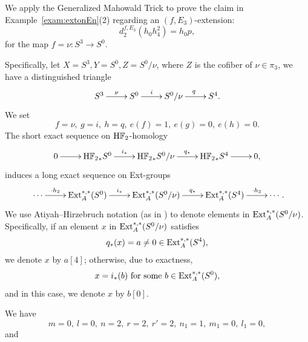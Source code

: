 \documentclass{amsart}
\numberwithin{equation}{section}
\newcommand{\HF}{\mathrm{H}\bF_2}
\begin{document}
\begin{example} \label{exam:Mahowald}
    We apply the Generalized Mahowald Trick to prove the claim in Example~\ref{exam:extonEn}(2) regarding an $(f, E_3)$-extension:
        $$d_2^{f, E_3} (h_0h_4^2) = h_0 p,$$
        for the map $f=\nu:S^3 \rightarrow S^0$.

        Specifically, let $X = S^3, Y = S^0, Z = S^0/\nu$, where $Z$ is the cofiber of $\nu \in \pi_3$, we have a distinguished triangle
        $$\xymatrix{S^3 \ar[r]^{\nu} & S^0 \ar[r]^-{i} & S^0/\nu \ar[r]^{q} & S^4.}$$
We set
$$f=\nu, \ g=i, \ h=q, \ e(f)=1, \ e(g)=0, \ e(h)=0.$$
The short exact sequence on $\HF$-homology
$$\xymatrix{0 \ar[r] & {\HF}_*S^0 \ar[r]^-{i_*} & {\HF}_*S^0/\nu \ar[r]^-{q_*} & {\HF}_*S^4 \ar[r] & 0,}$$
induces a long exact sequence on Ext-groups
$$\xymatrix{\cdots \ar[r]^-{\cdot h_2} & {\Ext}_A^{*,*}(S^0) \ar[r]^-{i_*} & {\Ext}_A^{*,*}(S^0/\nu) \ar[r]^-{q_*} & {\Ext}_A^{*,*}(S^4) \ar[r]^-{\cdot h_2} & \cdots}.$$
We use Atiyah--Hirzebruch notation (as in \cite[Notation 3.3]{WX61, WangXu51ext}) to denote elements in ${\mathrm{Ext}}_A^{*,*}(S^0/\nu)$. Specifically, if an element $x$ in ${\mathrm{Ext}}_A^{*,*}(S^0/\nu)$ satisfies 
$$q_*(x) = a \neq 0 \in \mathrm{Ext}_A^{*,*}(S^4),$$ 
we denote $x$ by $a[4]$; otherwise, due to exactness, 
$$x = i_*(b) \ \text{for some} \ b \in \Ext_A^{*,*}(S^0),$$
and in this case, we denote $x$ by $b[0]$. 

We have
$$m=0, \ l=0, \ n=2, \ r=2, \ r'=2, \ n_1=1, \ m_1=0, \ l_1=0,$$
and


\end{example}
\end{document}
